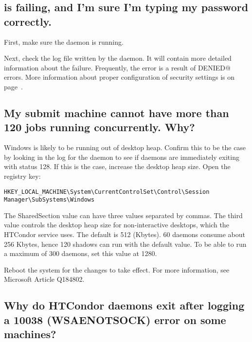 \subsection*{ is failing, and I'm sure I'm typing my password correctly.}

First, make sure the  daemon is running.

Next, check the log file written by the  daemon.
It will contain more detailed information about the failure.
Frequently, the error is a result of 
\verb@PERMISSION DENIED@ errors.
More information about proper configuration of 
security settings is on page~\pageref{sec:Host-Security}.


\subsection*{My submit machine cannot have more than 120 jobs running concurrently. Why?}

Windows is likely to be running out of desktop heap. 
Confirm this to be the case
by looking in the log for the  daemon
to see if  daemons are immediately
exiting with status 128.
If this is the case, increase the desktop heap size.
Open the registry key:

\footnotesize
\begin{verbatim}
HKEY_LOCAL_MACHINE\System\CurrentControlSet\Control\Session Manager\SubSystems\Windows
\end{verbatim}
\normalsize

The SharedSection value can have three values separated by commas.
The third value controls the desktop heap size for non-interactive desktops,
which the HTCondor service uses.
The default is 512 (Kbytes).
60  daemons consume about 256 Kbytes,
hence 120 shadows can run with the default value.
To be able to run a maximum of 300  daemons,
set this value at 1280.

Reboot the system for the changes to take effect.
For more information,
see Microsoft Article Q184802.

\subsection*{Why do HTCondor daemons exit after logging a 10038 (WSAENOTSOCK) error on some machines?}

